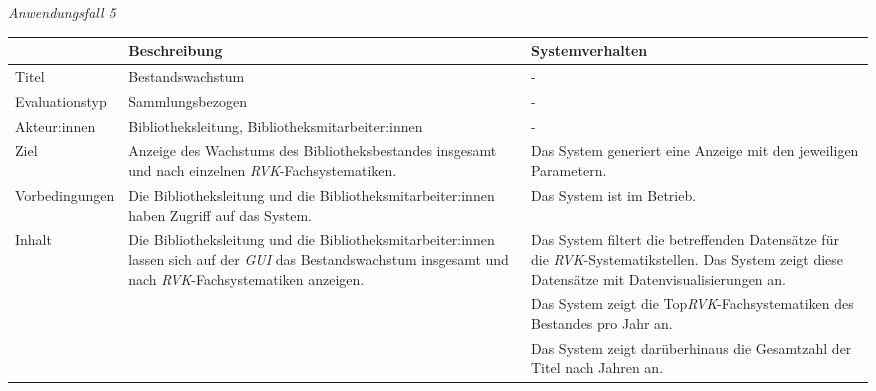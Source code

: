 \newpage
\noindent
\textit{Anwendungsfall 5}

\begingroup
\setlength{\tabcolsep}{10pt} %
\renewcommand{\arraystretch}{1.25} 
\begin{table}[H]
    \centering
    \begin{adjustbox}{max width=\textwidth}
    \begin{tabular}{lp{7.0cm}p{7.0cm}}
       \toprule
       \textbf{}          & \textbf{Beschreibung} &\textbf{Systemverhalten}\\
       \midrule
        Titel                            &Bestandswachstum& -\\
        Evaluationstyp                   &Sammlungsbezogen                   & -\\
        Akteur:innen                     &Bibliotheksleitung, Bibliotheksmitarbeiter:innen& -\\
        Ziel                             &Anzeige des Wachstums des Bibliotheksbestandes insgesamt und nach einzelnen \textit{\acrshort{RVK}}-Fachsystematiken.& Das System generiert eine Anzeige mit den jeweiligen Parametern.\\
        Vorbedingungen                   &Die Bibliotheksleitung und die Bibliotheksmitarbeiter:innen haben Zugriff auf das System.& Das System ist im Betrieb.\\
        Inhalt                           &Die Bibliotheksleitung und die Bibliotheksmitarbeiter:innen lassen sich auf der \textit{\acrshort{GUI}} das Bestandswachstum insgesamt und nach \textit{\acrshort{RVK}}-Fachsystematiken anzeigen.& Das System filtert die betreffenden Datensätze für die  \textit{\acrshort{RVK}}-Systematikstellen. Das System zeigt diese Datensätze mit Datenvisualisierungen an.\\
                                         & &Das System zeigt die Top\textit{\acrshort{RVK}}-Fachsystematiken des Bestandes pro Jahr an.\\
                                         & &Das System zeigt darüberhinaus die Gesamtzahl der Titel nach Jahren an.\\

\end{tabular}
\end{adjustbox}
\end{table}
